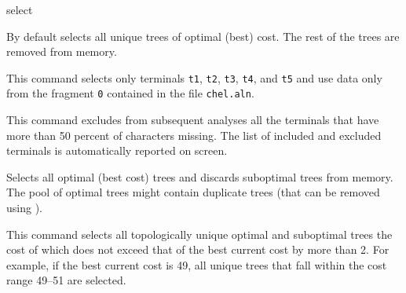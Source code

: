 \begin{command}{select}{}
\begin{arguments}
    
    \end{arguments}
                          
        {By default \poy selects all unique trees of optimal (best) cost. The rest of
        the trees are removed from memory.}

    \begin{poyexamples}
        
            {This command selects only terminals \texttt{t1},  \texttt{t2},
             \texttt{t3},  \texttt{t4}, and  \texttt{t5} and use data only from the
              fragment  \texttt{0} contained in the file \texttt{chel.aln}.}
    
            {This command excludes from subsequent analyses all the terminals that
            have more than 50 percent of characters missing. The list of included and excluded
            terminals is automatically reported on screen.}
    
            {Selects all optimal (best cost) trees and discards suboptimal trees from
            memory. The pool of optimal trees might contain duplicate trees (that can
            be removed using ).}
            
            {This command selects all topologically unique optimal and suboptimal trees
            the cost of which does not exceed that of the best current cost by more than
            2. For example, if the best current cost is 49, all unique trees that fall within
            the cost range 49--51 are selected.}
    
    \end{poyexamples}

    \begin{poyalso}
    \end{poyalso}

\end{command}



   
